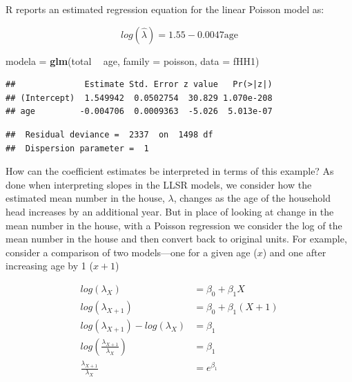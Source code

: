 \documentclass[
]{krantz}
\newenvironment{Shaded}{\begin{snugshade}}{\end{snugshade}}
\newcommand{\DataTypeTok}[1]{\textcolor[rgb]{0.27,0.27,0.27}{#1}}
\newcommand{\KeywordTok}[1]{\textcolor[rgb]{0.27,0.27,0.27}{\textbf{#1}}}
\newcommand{\NormalTok}[1]{#1}
\newcommand{\OperatorTok}[1]{\textcolor[rgb]{0.43,0.43,0.43}{\textbf{#1}}}
\newcommand{\StringTok}[1]{\textcolor[rgb]{0.5,0.5,0.5}{#1}}
\begin{document}
R reports an estimated regression equation for the linear Poisson model as:

\begin{equation*}
log(\hat{\lambda}) = 1.55 - 0.0047 \textrm{age}
\end{equation*}

\begin{Shaded}
\begin{Highlighting}[]
\NormalTok{modela =}\StringTok{ }\KeywordTok{glm}\NormalTok{(total }\OperatorTok{~}\StringTok{ }\NormalTok{age, }\DataTypeTok{family =}\NormalTok{ poisson, }\DataTypeTok{data =}\NormalTok{ fHH1)}
\end{Highlighting}
\end{Shaded}

\begin{verbatim}
##              Estimate Std. Error z value   Pr(>|z|)
## (Intercept)  1.549942  0.0502754  30.829 1.070e-208
## age         -0.004706  0.0009363  -5.026  5.013e-07
\end{verbatim}

\begin{verbatim}
##  Residual deviance =  2337  on  1498 df 
##  Dispersion parameter =  1
\end{verbatim}

How can the coefficient estimates be interpreted in terms of this example? As done when interpreting slopes in the LLSR models, we consider how the estimated mean number in the house, \(\lambda\), changes as the age of the household head increases by an additional year. But in place of looking at change in the mean number in the house, with a Poisson regression we consider the log of the mean number in the house and then convert back to original units. For example, consider a comparison of two models---one for a given age (\(x\)) and one after increasing age by 1 (\(x+1\))

\begin{equation}
\begin{split}
log(\lambda_X) &= \beta_0 + \beta_1X \\
log(\lambda_{X+1}) &= \beta_0 + \beta_1(X+1) \\
log(\lambda_{X+1})-log(\lambda_X) &=  \beta_1 \\
log \left(\frac{\lambda_{X+1}}{\lambda_X}\right)   &= \beta_1\\
\frac{\lambda_{X+1}}{\lambda_X} &= e^{\beta_1}
\end{split}
\label{eq:rateRatio}
\end{equation}
\end{document}
